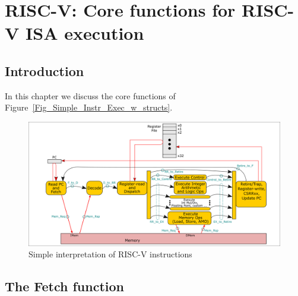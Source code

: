 

\chapter{RISC-V: Core functions for RISC-V ISA execution}


\setcounter{page}{1}
\renewcommand{\thepage}{\arabic{chapter}-\arabic{page}}

\label{ch_core_functions}


\section{Introduction}

In this chapter we discuss the core functions of
Figure~\ref{Fig_Simple_Instr_Exec_w_structs}.
\begin{figure}[htbp]
  \centerline{\includegraphics[width=6in,angle=0]{ch030_RISCV_Design_Space/Figures/Fig_Instr_Exec_w_structs}}
  \caption{\label{Fig_Fetch_function_Simple_Instr_Exec}
           Simple interpretation of RISC-V instructions}
\end{figure}


\section{The Fetch function}

\label{Sec_Fetch_function}


